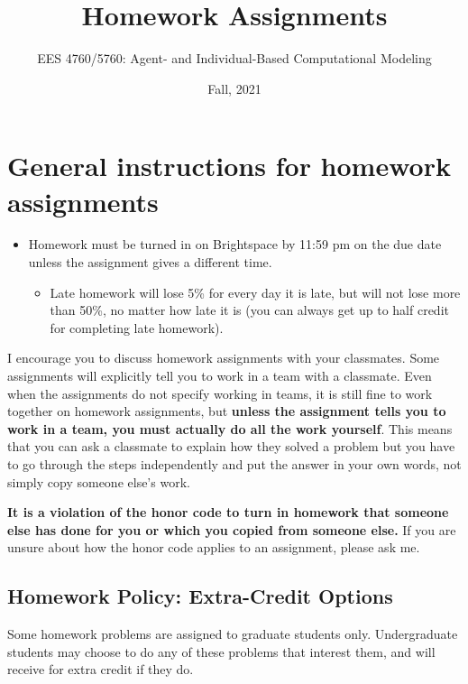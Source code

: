 \documentclass[
]{article}
\title{Homework Assignments}
\author{EES 4760/5760: Agent- and Individual-Based Computational
Modeling}
\date{Fall, 2021}
\providecommand{\tightlist}{%
  \setlength{\itemsep}{0pt}\setlength{\parskip}{0pt}}
\begin{document}
\maketitle

\hypertarget{general-instructions-for-homework-assignments}{%
\section{General instructions for homework
assignments}\label{general-instructions-for-homework-assignments}}

\begin{itemize}
\tightlist
\item
  Homework must be turned in on Brightspace by 11:59 pm on the due date
  unless the assignment gives a different time.

  \begin{itemize}
  \tightlist
  \item
    Late homework will lose 5\% for every day it is late, but will not
    lose more than 50\%, no matter how late it is (you can always get up
    to half credit for completing late homework).
  \end{itemize}
\end{itemize}

I encourage you to discuss homework assignments with your classmates.
Some assignments will explicitly tell you to work in a team with a
classmate. Even when the assignments do not specify working in teams, it
is still fine to work together on homework assignments, but
\textbf{unless the assignment tells you to work in a team, you must
actually do all the work yourself}. This means that you can ask a
classmate to explain how they solved a problem but you have to go
through the steps independently and put the answer in your own words,
not simply copy someone else's work.

\textbf{It is a violation of the honor code to turn in homework that
someone else has done for you or which you copied from someone else.} If
you are unsure about how the honor code applies to an assignment, please
ask me.

\hypertarget{homework-policy-extra-credit-options}{%
\subsection{Homework Policy: Extra-Credit
Options}\label{homework-policy-extra-credit-options}}

Some homework problems are assigned to graduate students only.
Undergraduate students may choose to do any of these problems that
interest them, and will receive for extra credit if they do.
\end{document}
